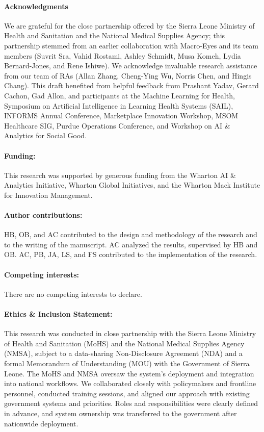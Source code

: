 \documentclass[12pt]{article}
\begin{document}
\paragraph*{Acknowledgments}
We are grateful for the close partnership offered by the Sierra Leone Ministry of Health and Sanitation and the National Medical Supplies Agency; this partnership stemmed from an earlier collaboration with Macro-Eyes and its team members (Suvrit Sra, Vahid Rostami, Ashley Schmidt, Musa Komeh, Lydia Bernard-Jones, and Rene Ishiwe). We acknowledge invaluable research assistance from our team of RAs (Allan Zhang, Cheng-Ying Wu, Norris Chen, and Hingis Chang). This draft benefited from helpful feedback from Prashant Yadav, Gerard Cachon, Gad Allon, and participants at the Machine Learning for Health, Symposium on Artificial Intelligence in Learning Health Systems (SAIL), INFORMS Annual Conference, Marketplace Innovation Workshop, MSOM Healthcare SIG, Purdue Operations Conference, and Workshop on AI \& Analytics for Social Good.

\paragraph*{Funding:} This research was supported by generous funding from the Wharton AI \& Analytics Initiative, Wharton Global Initiatives, and the Wharton Mack Institute for Innovation Management.

\paragraph*{Author contributions:}
HB, OB, and AC contributed to the design and methodology of the research and to the writing of the manuscript. AC analyzed the results, supervised by HB and OB. AC, PB, JA, LS, and FS contributed to the implementation of the research.

\paragraph*{Competing interests:}

There are no competing interests to declare.

\paragraph*{Ethics \& Inclusion Statement:} This research was conducted in close partnership with the Sierra Leone Ministry of Health and Sanitation (MoHS) and the National Medical Supplies Agency (NMSA), subject to a data-sharing Non-Disclosure Agreement (NDA) and a formal Memorandum of Understanding (MOU) with the Government of Sierra Leone. The MoHS and NMSA oversaw the system’s deployment and integration into national workflows. We collaborated closely with policymakers and frontline personnel, conducted training sessions, and aligned our approach with existing government systems and priorities. Roles and responsibilities were clearly defined in advance, and system ownership was transferred to the government after nationwide deployment.
\end{document}
